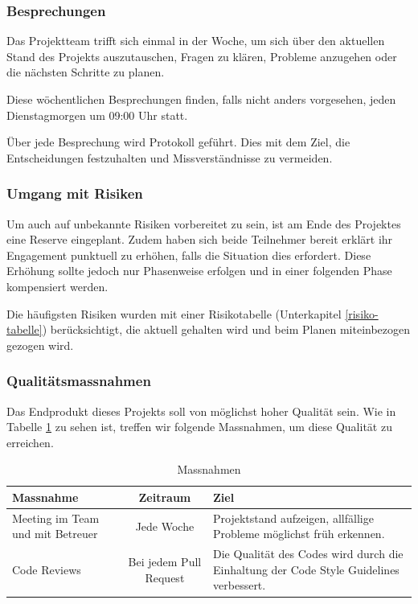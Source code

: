 \subsubsection*{Besprechungen}
Das Projektteam trifft sich einmal in der Woche, um sich über den aktuellen Stand des Projekts auszutauschen, Fragen zu klären, Probleme anzugehen oder die nächsten Schritte zu planen. 

Diese wöchentlichen Besprechungen finden, falls nicht anders vorgesehen, jeden Dienstagmorgen um 09:00 Uhr statt. 

Über jede Besprechung wird Protokoll geführt. Dies mit dem Ziel, die Entscheidungen festzuhalten und Missverständnisse zu vermeiden.


\subsubsection*{Umgang mit Risiken}
Um auch auf unbekannte Risiken vorbereitet zu sein, ist am Ende des Projektes eine Reserve eingeplant. Zudem haben sich beide Teilnehmer bereit erklärt ihr Engagement punktuell zu erhöhen, falls die Situation dies erfordert. Diese Erhöhung sollte jedoch nur Phasenweise erfolgen und in einer folgenden Phase kompensiert werden. 

Die häufigsten Risiken wurden mit einer Risikotabelle (Unterkapitel \ref{risiko-tabelle}) be\-rück\-sichtigt, die aktuell gehalten wird und beim Planen miteinbezogen gezogen wird. 

\subsubsection*{Qualitätsmassnahmen}
Das Endprodukt dieses Projekts soll von möglichst hoher Qualität sein. Wie in Tabelle \ref{tab:Massnahmen} zu sehen ist, treffen wir folgende Massnahmen, um diese Qualität zu erreichen.

\renewcommand{\arraystretch}{2}
\begin{table}[h]
  \begin{tabular}{ | p{3cm} | c | p{5.5cm} | }
  	\hline
    \textbf{Massnahme}			& \textbf{Zeitraum}	 	& \textbf{Ziel} \\
    \hline
    Meeting im Team und mit Betreuer & Jede Woche & Projektstand aufzeigen, allfällige Probleme möglichst früh erkennen.\\
    \hline
    Code Reviews & Bei jedem Pull Request & Die Qualität des Codes wird durch die Einhaltung der Code Style Guidelines verbessert.\\
    \hline
  \end{tabular}
  \caption[Projektplan]{Massnahmen}
  \label{tab:Massnahmen}
\end{table}

